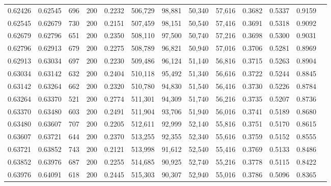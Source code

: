 \begin{tabular}{rrrrrrrrrrrrr}
0.62426 & 0.62545 &    696 & 200 &                                     0.2232 & 506,729 &  98,881 &  50,340 &  57,616 & 0.3682 & 0.5337 & 0.9159 \\
0.62545 & 0.62679 &    730 & 200 &                                     0.2151 & 507,459 &  98,151 &  50,540 &  57,416 & 0.3691 & 0.5318 & 0.9092 \\
0.62679 & 0.62796 &    651 & 200 &                                     0.2350 & 508,110 &  97,500 &  50,740 &  57,216 & 0.3698 & 0.5300 & 0.9031 \\
0.62796 & 0.62913 &    679 & 200 &                                     0.2275 & 508,789 &  96,821 &  50,940 &  57,016 & 0.3706 & 0.5281 & 0.8969 \\
0.62913 & 0.63034 &    697 & 200 &                                     0.2230 & 509,486 &  96,124 &  51,140 &  56,816 & 0.3715 & 0.5263 & 0.8904 \\
0.63034 & 0.63142 &    632 & 200 &                                     0.2404 & 510,118 &  95,492 &  51,340 &  56,616 & 0.3722 & 0.5244 & 0.8845 \\
0.63142 & 0.63264 &    662 & 200 &                                     0.2320 & 510,780 &  94,830 &  51,540 &  56,416 & 0.3730 & 0.5226 & 0.8784 \\
0.63264 & 0.63370 &    521 & 200 &                                     0.2774 & 511,301 &  94,309 &  51,740 &  56,216 & 0.3735 & 0.5207 & 0.8736 \\
0.63370 & 0.63480 &    603 & 200 &                                     0.2491 & 511,904 &  93,706 &  51,940 &  56,016 & 0.3741 & 0.5189 & 0.8680 \\
0.63480 & 0.63607 &    707 & 200 &                                     0.2205 & 512,611 &  92,999 &  52,140 &  55,816 & 0.3751 & 0.5170 & 0.8615 \\
0.63607 & 0.63721 &    644 & 200 &                                     0.2370 & 513,255 &  92,355 &  52,340 &  55,616 & 0.3759 & 0.5152 & 0.8555 \\
0.63721 & 0.63852 &    743 & 200 &                                     0.2121 & 513,998 &  91,612 &  52,540 &  55,416 & 0.3769 & 0.5133 & 0.8486 \\
0.63852 & 0.63976 &    687 & 200 &                                     0.2255 & 514,685 &  90,925 &  52,740 &  55,216 & 0.3778 & 0.5115 & 0.8422 \\
0.63976 & 0.64091 &    618 & 200 &                                     0.2445 & 515,303 &  90,307 &  52,940 &  55,016 & 0.3786 & 0.5096 & 0.8365 \\

\end{tabular}
